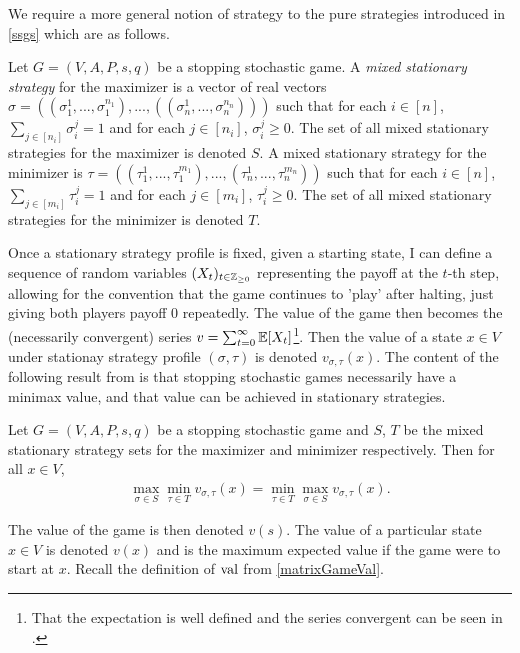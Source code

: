 We require a more general notion of strategy to the pure strategies introduced in \cref{ssgs} which
are as follows.
\begin{definition}
  Let $G = (V, A, P, s, q)$ be a stopping stochastic game. A \emph{mixed stationary strategy}
  for the maximizer is a vector of real vectors 
  $\sigma = ((\sigma_1^{1}, ..., \sigma_1^{n_1}), ..., ((\sigma_n^{1}, ..., \sigma_n^{n_n})))$ such
  that for each $i \in [n]$, $\sum_{j \in [n_i]} \sigma_i^j = 1$ and for each $j \in [n_i]$, $\sigma_i^j \geq 0$.
  The set of all mixed stationary strategies for the maximizer is denoted $S$.
  A mixed stationary strategy for the minimizer is 
  $\tau = ((\tau_1^{1}, ..., \tau_1^{m_1}), ..., (\tau_n^{1}, ..., \tau_n^{m_n}))$
  such that for each $i \in [n]$, $\sum_{j \in [m_i]} \tau_i^j = 1$ 
  and for each $j \in [m_i]$, $\tau_i^j \geq 0$.
  The set of all mixed stationary strategies for the minimizer is denoted $T$.
\end{definition}
Once a stationary strategy profile is fixed, given a starting state, 
I can define a sequence of random variables
$(X_t)_{t \in \mathbb{Z}_{\geq 0}}$ representing the payoff at the $t$-th step, allowing for the convention
that the game continues to 'play' after halting, just giving both players payoff 0 repeatedly. The value of the game
then becomes the (necessarily convergent) series $v = \sum_{t = 0}^\infty \mathbb{E}[X_t]$\footnote{
  That the expectation is well defined and the series convergent can be seen in \citep[Chapter 2]{compMdps}.}. Then the value of a state $x \in V$ 
under stationay strategy profile $(\sigma, \tau)$ is denoted $v_{\sigma, \tau}(x)$. The content of the following
result from \citep{shapley} is that stopping stochastic games necessarily have a minimax value, and that value can be achieved
in stationary strategies.
\begin{prop}
  Let $G = (V, A, P, s, q)$ be a stopping stochastic game and $S$, $T$ be the mixed stationary strategy
  sets for the maximizer and minimizer respectively. Then for all $x \in V$, 
  \begin{align*}
    \max_{\sigma \in S} \min_{\tau \in T} v_{\sigma, \tau}(x) = \min_{\tau \in T} \max_{\sigma \in S} v_{\sigma, \tau}(x).
  \end{align*}
\end{prop}
The value of the game is then denoted $v(s)$. The value of a particular state $x \in V$ is denoted $v(x)$
and is the maximum expected value if the game were to start at $x$.
Recall the definition of $\mathrm{val}$ from \cref{matrixGameVal}.
